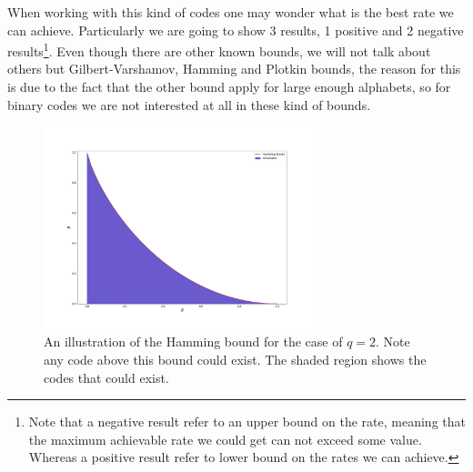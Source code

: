 \indent When working with this kind of codes one may wonder what is the best rate we can achieve. Particularly we are going to show 3 results, 1 positive and 2 negative results\footnote{Note that a negative result refer to an upper bound on the rate, meaning that the maximum achievable rate we could get can not exceed some value. Whereas a positive result refer to  lower bound on the rates we can achieve.}. Even though there are other known bounds, we will not talk about others but Gilbert-Varshamov, Hamming and Plotkin bounds, the reason for this is due to the fact that the other bound apply for large enough alphabets, so for binary codes we are not interested at all in these kind of bounds\cite{mackay_information_2003}.
\begin{figure}
\centering
\includegraphics[width=0.7\textwidth]{Figures/Hamming_bound.png}
\caption{An illustration of the Hamming bound for the case of $q=2$. Note any code above this bound could exist. The shaded region shows the codes that could exist.  }
\end{figure}

